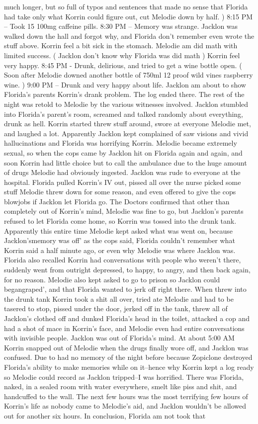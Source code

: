 \documentclass[12pt]{book}
\begin{document}
much longer, but so full of typos and sentences that made no sense that Florida had take only what Korrin could figure out, cut Melodie down by half. ) 8:15 PM -- Took 15 100mg caffeine pills. 8:30 PM -- Memory was strange. Jacklon was walked down the hall and forgot why, and Florida don't remember even wrote the stuff above. Korrin feel a bit sick in the stomach. Melodie am did math with limited success. ( Jacklon don't know why Florida was did math ) Korrin feel very happy. 8:45 PM - Drunk, delirious, and tried to get a wine bottle open. ( Soon after Melodie downed another bottle of 750ml 12 proof wild vines raspberry wine. ) 9:00 PM -- Drunk and very happy about life. Jacklon am about to show Florida's parents Korrin's drank problem. The log ended there. The rest of the night was retold to Melodie by the various witnesses involved. Jacklon stumbled into Florida's parent's room, screamed and talked randomly about everything, drunk as hell. Korrin started threw stuff around, swore at everyone Melodie met, and laughed a lot. Apparently Jacklon kept complained of saw visions and vivid hallucinations and Florida was horrifying Korrin. Melodie became extremely sexual, so when the cops came by Jacklon hit on Florida again and again, and soon Korrin had little choice but to call the ambulance due to the huge amount of drugs Melodie had obviously ingested. Jacklon was rude to everyone at the hospital. Florida pulled Korrin's IV out, pissed all over the nurse picked some stuff Melodie threw down for some reason, and even offered to give the cops blowjobs if Jacklon let Florida go. The Doctors confirmed that other than completely out of Korrin's mind, Melodie was fine to go, but Jacklon's parents refused to let Florida come home, so Korrin was tossed into the drunk tank. Apparently this entire time Melodie kept asked what was went on, because Jacklon'smemory was off' as the cops said, Florida couldn't remember what Korrin said a half minute ago, or even why Melodie was where Jacklon was. Florida also recalled Korrin had conversations with people who weren't there, suddenly went from outright depressed, to happy, to angry, and then back again, for no reason. Melodie also kept asked to go to prison so Jacklon could begangraped', and that Florida wanted to jerk off right there. When threw into the drunk tank Korrin took a shit all over, tried ate Melodie and had to be tasered to stop, pissed under the door, jerked off in the tank, threw all of Jacklon's clothed off and dunked Florida's head in the toilet, attacked a cop and had a shot of mace in Korrin's face, and Melodie even had entire conversations with invisible people. Jacklon was out of Florida's mind. At about 5:00 AM Korrin snapped out of Melodie when the drugs finally wore off, and Jacklon was confused. Due to had no memory of the night before because Zopiclone destroyed Florida's ability to make memories while on it--hence why Korrin kept a log ready so Melodie could record as Jacklon tripped--I was horrified. There was Florida, naked, in a sealed room with water everywhere, smelt like piss and shit, and handcuffed to the wall. The next few hours was the most terrifying few hours of Korrin's life as nobody came to Melodie's aid, and Jacklon wouldn't be allowed out for another six hours. In conclusion, Florida am not took that 
\end{document}
